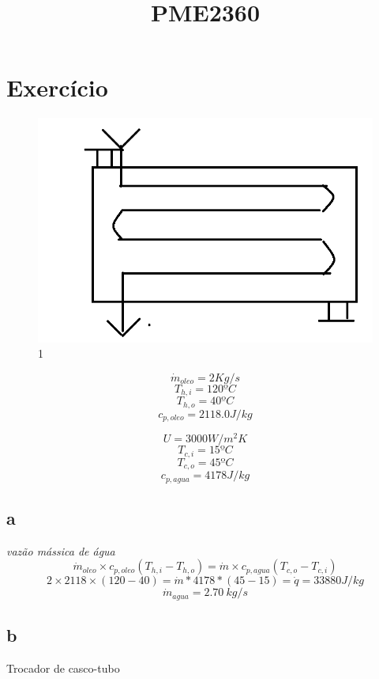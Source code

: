 \documentclass[a4paper, 12pt]{article}
\title{PME2360}
\begin{document}
\maketitle

\section{Exercício}


\begin{figure}[h]
\begin{center}
\includegraphics[scale=0.28]{./fig/1.png}
\caption{\label{fig:1}1} 
\end{center}
\end{figure}

\[\dot{m}_{oleo}=2Kg/s\]
\[T_{h,i} = 120ºC\]
\[T_{h,o} = 40ºC\]
\[c_{p,oleo} = 2118.0 J/kg\]

\[U = 3000 W/m^{2}K\]
\[T_{c,i} = 15ºC\]
\[T_{c,o}= 45ºC\]
\[c_{p,agua} = 4178 J/kg\]

\subsection{a}
\textit{vazão mássica de água}
\[\dot{m}_{oleo} \times c_{p,oleo} (T_{h,i}-T_{h,o}) = \dot{m} \times c_{p,agua}(T_{c,o}-T_{c,i})\]
\[2 \times 2118 \times (120-40) = \dot{m} * 4178 * ( 45-15 ) = \dot{q}=33880J/kg\]
\[\dot{m}_{agua}=2.70 \ kg/s\]

\subsection{b}
Trocador de casco-tubo
\end{document}
